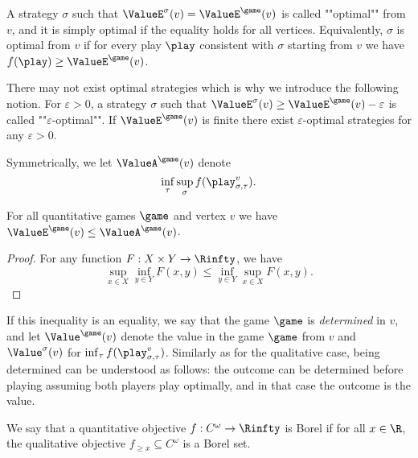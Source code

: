 A strategy $\sigma$ such that $\ValueE^\sigma(v) = \ValueE^{\game}(v)$ is called ""optimal"" from $v$,
and it is simply optimal if the equality holds for all vertices.
Equivalently, $\sigma$ is optimal from $v$ if for every play $\play$ consistent with $\sigma$ starting from $v$ 
we have $f(\play) \ge \ValueE^{\game}(v)$.

There may not exist optimal strategies which is why we introduce the following notion.
For $\varepsilon > 0$, a strategy $\sigma$ such that $\ValueE^\sigma(v) \ge \ValueE^{\game}(v) - \varepsilon$
is called ""$\varepsilon$-optimal"".
If $\ValueE^{\game}(v)$ is finite there exist $\varepsilon$-optimal strategies for any $\varepsilon > 0$.

Symmetrically, we let $\ValueA^{\game}(v)$ denote 
\[
\inf_{\tau} \sup_{\sigma} f(\play_{\sigma,\tau}^{v}).
\]
\begin{fact}
\label{1-fact:comparaison_values_eve_adam}
For all quantitative games $\game$ and vertex $v$ we have $\ValueE^{\game}(v) \le \ValueA^{\game}(v)$.
\end{fact}
\begin{proof}
For any function $F : X \times Y \to \Rinfty$, we have 
\[
\sup_{x \in X} \inf_{y \in Y} F(x,y) \le \inf_{y \in Y} \sup_{x \in X} F(x,y).
\]
\end{proof}

If this inequality is an equality, we say that the game $\game$ is \textit{determined} in $v$,
and let $\Value^{\game}(v)$ denote the value in the game $\game$ from $v$
and $\Value^\sigma(v)$ for $\inf_{\tau} f(\play_{\sigma,\tau}^{v})$.
Similarly as for the qualitative case, being determined can be understood as follows: the outcome can be determined before playing assuming both players play optimally, and in that case the outcome is the value.

We say that a quantitative objective $f : C^\omega \to \Rinfty$ is Borel if for all $x \in \R$,
the qualitative objective $f_{\ge x} \subseteq C^\omega$ is a Borel set.


